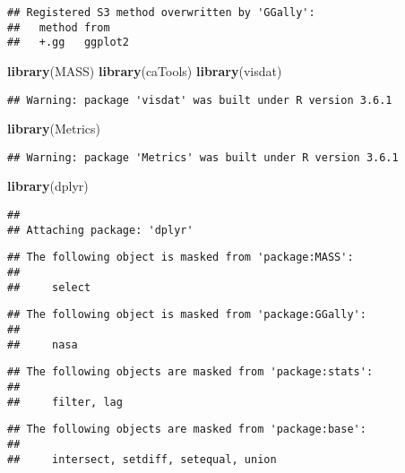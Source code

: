 \documentclass[]{article}
\newenvironment{Shaded}{\begin{snugshade}}{\end{snugshade}}
\newcommand{\KeywordTok}[1]{\textcolor[rgb]{0.13,0.29,0.53}{\textbf{#1}}}
\newcommand{\NormalTok}[1]{#1}
\begin{document}
\begin{verbatim}
## Registered S3 method overwritten by 'GGally':
##   method from   
##   +.gg   ggplot2
\end{verbatim}

\begin{Shaded}
\begin{Highlighting}[]
  \KeywordTok{library}\NormalTok{(MASS)}
  \KeywordTok{library}\NormalTok{(caTools)}
  \KeywordTok{library}\NormalTok{(visdat)}
\end{Highlighting}
\end{Shaded}

\begin{verbatim}
## Warning: package 'visdat' was built under R version 3.6.1
\end{verbatim}

\begin{Shaded}
\begin{Highlighting}[]
  \KeywordTok{library}\NormalTok{(Metrics)}
\end{Highlighting}
\end{Shaded}

\begin{verbatim}
## Warning: package 'Metrics' was built under R version 3.6.1
\end{verbatim}

\begin{Shaded}
\begin{Highlighting}[]
  \KeywordTok{library}\NormalTok{(dplyr)}
\end{Highlighting}
\end{Shaded}

\begin{verbatim}
## 
## Attaching package: 'dplyr'
\end{verbatim}

\begin{verbatim}
## The following object is masked from 'package:MASS':
## 
##     select
\end{verbatim}

\begin{verbatim}
## The following object is masked from 'package:GGally':
## 
##     nasa
\end{verbatim}

\begin{verbatim}
## The following objects are masked from 'package:stats':
## 
##     filter, lag
\end{verbatim}

\begin{verbatim}
## The following objects are masked from 'package:base':
## 
##     intersect, setdiff, setequal, union
\end{verbatim}
\end{document}
